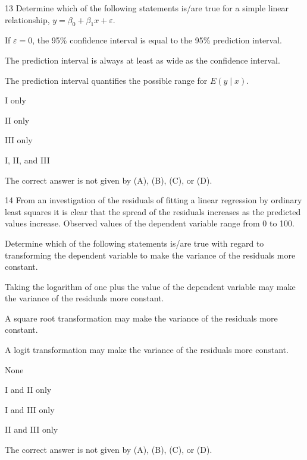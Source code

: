 \begin{question}{13}
Determine which of the following statements is/are true for a simple linear relationship, $y = \beta_0 + \beta_1 x + \varepsilon$.
\begin{statements}
\item If $\varepsilon = 0$, the 95\% confidence interval is equal to the 95\% prediction interval.
\item The prediction interval is always at least as wide as the confidence interval.
\item The prediction interval quantifies the possible range for $E(y \mid x)$.
\end{statements}

\begin{choices}
\item I only
\item II only
\item III only
\item I, II, and III
\item The correct answer is not given by (A), (B), (C), or (D).
\end{choices}
\end{question}
\begin{question}{14}
From an investigation of the residuals of fitting a linear regression by ordinary least squares it is clear that the spread of the residuals increases as the predicted values increase. Observed values of the dependent variable range from 0 to 100.

Determine which of the following statements is/are true with regard to transforming the dependent variable to make the variance of the residuals more constant.
\begin{statements}
\item Taking the logarithm of one plus the value of the dependent variable may make the variance of the residuals more constant.
\item A square root transformation may make the variance of the residuals more constant.
\item A logit transformation may make the variance of the residuals more constant.
\end{statements}

\begin{choices}
\item None
\item I and II only
\item I and III only
\item II and III only
\item The correct answer is not given by (A), (B), (C), or (D).
\end{choices}
\end{question}

